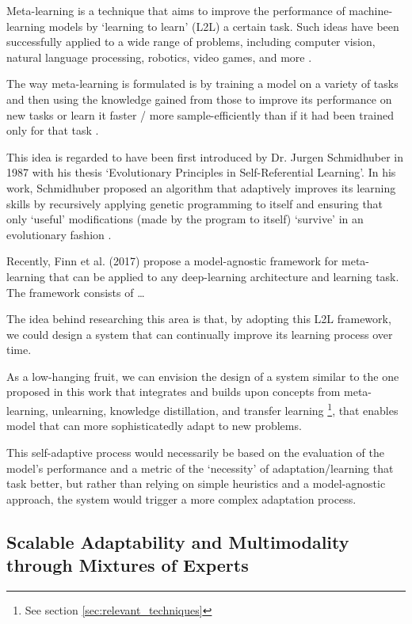 \documentclass[../main.tex]{subfiles}
\begin{document}
    Meta-learning is a technique that aims to improve the performance of machine-learning models by `learning to learn' (L2L) a certain task. Such ideas have been successfully applied to a wide range of problems, including computer vision, natural language processing, robotics, video games, and more \cite{hospedales_meta-learning_2020}.
    
    The way meta-learning is formulated is by training a model on a variety of tasks and then using the knowledge gained from those to improve its performance on new tasks or learn it faster / more sample-efficiently than if it had been trained only for that task \cite{hospedales_meta-learning_2020}.
    
    This idea is regarded to have been first introduced by Dr. Jurgen Schmidhuber in 1987 with his thesis `Evolutionary Principles in Self-Referential Learning'. In his work, Schmidhuber proposed an algorithm that adaptively improves its learning skills by recursively applying genetic programming to itself and ensuring that only `useful' modifications (made by the program to itself) `survive' in an evolutionary fashion \cite{schmidhuber_evolutionary_1987}.
    
    Recently, Finn et al. (2017) \cite{finn_model-agnostic_2017} propose a model-agnostic framework for meta-learning that can be applied to any deep-learning architecture and learning task. The framework consists of \dots

    The idea behind researching this area is that, by adopting this L2L framework, we could design a system that can continually improve its learning process over time.

    As a low-hanging fruit, we can envision the design of a system similar to the one proposed in this work that integrates and builds upon concepts from meta-learning, unlearning, knowledge distillation, and transfer learning \footnote{See section \ref{sec:relevant_techniques}}, that enables model that can more sophisticatedly adapt to new problems. 
    
    This self-adaptive process would necessarily be based on the evaluation of the model's performance and a metric of the `necessity' of adaptation/learning that task better, but rather than relying on simple heuristics and a model-agnostic approach, the system would trigger a more complex adaptation process.

    \clearpage

    \subsection{Scalable Adaptability and Multimodality through Mixtures of Experts} \label{conclusions:research_directions:moes} 
\end{document}

